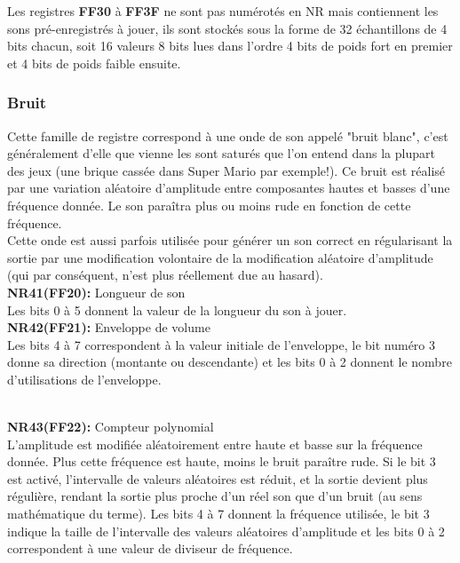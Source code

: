 \documentclass{report}
\begin{document}
		Les registres \textbf{FF30} à \textbf{FF3F} ne sont pas numérotés en NR
		mais contiennent les sons pré-enregistrés à jouer, ils
		sont stockés sous la forme de 32 échantillons de 4
		bits chacun, soit 16 valeurs 8 bits lues dans l'ordre
		4 bits de poids fort en premier et 4 bits de poids
		faible ensuite.

	\subsubsection{Bruit}
		Cette famille de registre correspond à une onde de son
		appelé "bruit blanc", c'est généralement d'elle que
		vienne les sont saturés que l'on entend dans la
		plupart des jeux (une brique cassée dans Super Mario
		par exemple!). 
		Ce bruit est réalisé par une variation aléatoire
		d'amplitude entre composantes hautes et basses d'une
		fréquence donnée. Le son paraîtra plus ou moins rude
		en fonction de cette fréquence. \\
		Cette onde est aussi parfois utilisée pour générer un
		son correct en régularisant la sortie par une
		modification volontaire de la modification aléatoire
		d'amplitude (qui par conséquent, n'est plus réellement
		due au hasard). \\

		\textbf{NR41(FF20):} Longueur de son \\
		Les bits 0 à 5 donnent la valeur de la longueur du son
		à jouer.\\

		\textbf{NR42(FF21):} Enveloppe de volume\\
		Les bits 4 à 7 correspondent à la valeur initiale de
		l'enveloppe, le bit numéro 3 donne sa direction
		(montante ou descendante) et les bits 0 à 2 donnent le
		nombre d'utilisations de l'enveloppe.\\ 

		\textbf{NR43(FF22):} Compteur polynomial \\
		L'amplitude est modifiée aléatoirement entre haute et
		basse sur la fréquence donnée. Plus cette fréquence
		est haute, moins le bruit paraître rude. 
		Si le bit 3 est activé, l'intervalle de valeurs
		aléatoires est réduit, et la sortie devient plus
		régulière, rendant la sortie plus proche d'un réel
		son que d'un bruit (au sens mathématique du terme).
		Les bits 4 à 7 donnent la fréquence utilisée, le bit 3
		indique la taille de l'intervalle des valeurs
		aléatoires d'amplitude et les bits 0 à 2 correspondent
		à une valeur de diviseur de fréquence.\\ 
\end{document}
